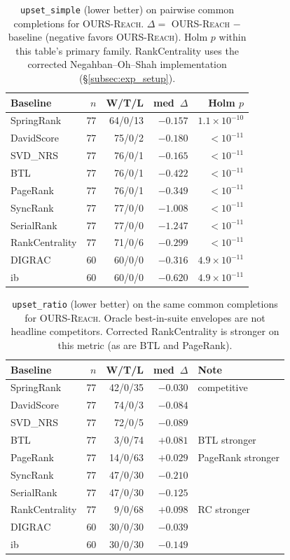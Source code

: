 \documentclass{article}
\begin{document}
\begin{table}[H]
\centering
\small
\setlength{\tabcolsep}{4pt}
\begin{tabular}{@{}lrrrr@{}}
\toprule
\textbf{Baseline} & $n$ & W/T/L & med~$\Delta$ & Holm $p$ \\
\midrule
SpringRank & 77 & 64/0/13 & $-0.157$ & $1.1\times 10^{-10}$ \\
DavidScore & 77 & 75/0/2 & $-0.180$ & $<10^{-11}$ \\
SVD\_NRS & 77 & 76/0/1 & $-0.165$ & $<10^{-11}$ \\
BTL & 77 & 76/0/1 & $-0.422$ & $<10^{-11}$ \\
PageRank & 77 & 76/0/1 & $-0.349$ & $<10^{-11}$ \\
SyncRank & 77 & 77/0/0 & $-1.008$ & $<10^{-11}$ \\
SerialRank & 77 & 77/0/0 & $-1.247$ & $<10^{-11}$ \\
RankCentrality & 77 & 71/0/6 & $-0.299$ & $<10^{-11}$ \\
DIGRAC & 60 & 60/0/0 & $-0.316$ & $4.9\times 10^{-11}$ \\
ib & 60 & 60/0/0 & $-0.620$ & $4.9\times 10^{-11}$ \\
\bottomrule
\end{tabular}
\caption{\texttt{upset\_simple} (lower better) on pairwise common completions for \textsc{OURS-Reach}.
$\Delta=$ \textsc{OURS-Reach} $-$ baseline (negative favors \textsc{OURS-Reach}). Holm $p$ within this table's primary family.
RankCentrality uses the corrected Negahban--Oh--Shah implementation (\S\ref{subsec:exp_setup}).}
\label{tab:pairwise_quality_simple}
\end{table}

\begin{table}[H]
\centering
\small
\setlength{\tabcolsep}{4pt}
\begin{tabular}{@{}lrrr l@{}}
\toprule
\textbf{Baseline} & $n$ & W/T/L & med~$\Delta$ & Note \\
\midrule
SpringRank & 77 & 42/0/35 & $-0.030$ & competitive \\
DavidScore & 77 & 74/0/3 & $-0.084$ & \\
SVD\_NRS & 77 & 72/0/5 & $-0.089$ & \\
BTL & 77 & 3/0/74 & $+0.081$ & BTL stronger \\
PageRank & 77 & 14/0/63 & $+0.029$ & PageRank stronger \\
SyncRank & 77 & 47/0/30 & $-0.210$ & \\
SerialRank & 77 & 47/0/30 & $-0.125$ & \\
RankCentrality & 77 & 9/0/68 & $+0.098$ & RC stronger \\
DIGRAC & 60 & 30/0/30 & $-0.039$ & \\
ib & 60 & 30/0/30 & $-0.149$ & \\
\bottomrule
\end{tabular}
\caption{\texttt{upset\_ratio} (lower better) on the same common completions for \textsc{OURS-Reach}.
Oracle best-in-suite envelopes are not headline competitors.
Corrected RankCentrality is stronger on this metric (as are BTL and PageRank).}
\label{tab:pairwise_quality_ratio}
\end{table}
\end{document}
